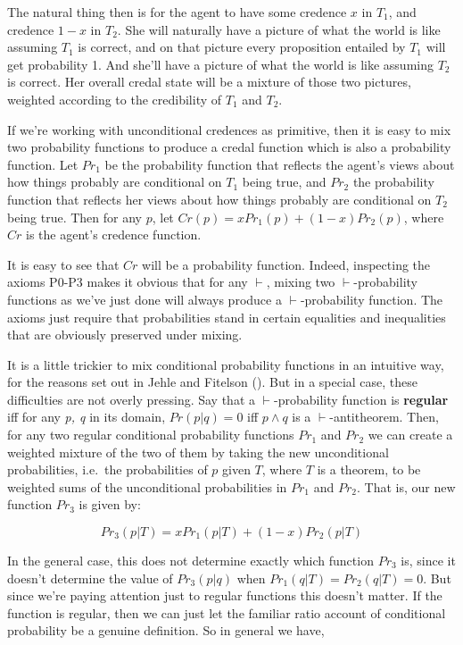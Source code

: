 \documentclass[
  11pt,
  letterpaper,
  DIV=11,
  numbers=noendperiod,
  oneside]{scrartcl}
\begin{document}
The natural thing then is for the agent to have some credence \(x\) in
\(T_1\), and credence \(1-x\) in \(T_2\). She will naturally have a
picture of what the world is like assuming \(T_1\) is correct, and on
that picture every proposition entailed by \(T_1\) will get probability
1. And she'll have a picture of what the world is like assuming \(T_2\)
is correct. Her overall credal state will be a mixture of those two
pictures, weighted according to the credibility of \(T_1\) and \(T_2\).

If we're working with unconditional credences as primitive, then it is
easy to mix two probability functions to produce a credal function which
is also a probability function. Let \(Pr_1\) be the probability function
that reflects the agent's views about how things probably are
conditional on \(T_1\) being true, and \(Pr_2\) the probability function
that reflects her views about how things probably are conditional on
\(T_2\) being true. Then for any \(p\), let
\(Cr(p) = xPr_1(p) + (1-x)Pr_2(p)\), where \(Cr\) is the agent's
credence function.

It is easy to see that \(Cr\) will be a probability function. Indeed,
inspecting the axioms P0-P3 makes it obvious that for any \(\vdash\),
mixing two \(\vdash\)-probability functions as we've just done will
always produce a \(\vdash\)-probability function. The axioms just
require that probabilities stand in certain equalities and inequalities
that are obviously preserved under mixing.

It is a little trickier to mix conditional probability functions in an
intuitive way, for the reasons set out in Jehle and Fitelson
(). But in a special case, these
difficulties are not overly pressing. Say that a \(\vdash\)-probability
function is \textbf{regular} iff for any \emph{p, q} in its domain,
\(Pr(p | q) = 0\) iff \(p \wedge q\) is a \(\vdash\)-antitheorem. Then,
for any two regular conditional probability functions \(Pr_1\) and
\(Pr_2\) we can create a weighted mixture of the two of them by taking
the new unconditional probabilities, i.e.~the probabilities of \(p\)
given \(T\), where \(T\) is a theorem, to be weighted sums of the
unconditional probabilities in \(Pr_1\) and \(Pr_2\). That is, our new
function \(Pr_3\) is given by:

\[
Pr_3(p | T) = xPr_1(p | T) + (1-x)Pr_2(p | T)
\]

In the general case, this does not determine exactly which function
\(Pr_3\) is, since it doesn't determine the value of \(Pr_3(p | q)\)
when \(Pr_1(q | T) = Pr_2(q | T) = 0\). But since we're paying attention
just to regular functions this doesn't matter. If the function is
regular, then we can just let the familiar ratio account of conditional
probability be a genuine definition. So in general we have,
\end{document}
